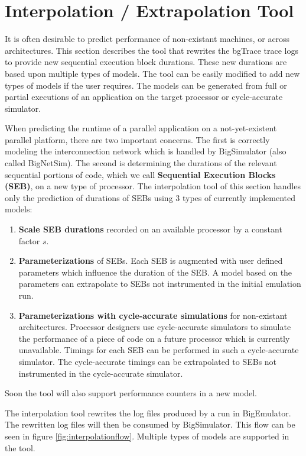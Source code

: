 \section{Interpolation / Extrapolation Tool\label{interpolation}}

It is often desirable to predict performance of non-existant machines, or across architectures. This section describes the  tool that rewrites the bgTrace trace logs to provide new sequential execution block durations. These new durations are based upon multiple types of models. The tool can be easily modified to add new types of models if the user requires. The models can be generated from full or partial executions of an application on the target processor or cycle-accurate simulator. 


When predicting the runtime of a parallel application on a not-yet-existent parallel platform, there are two important concerns. The first is correctly modeling the interconnection network which is handled by BigSimulator (also called BigNetSim). The second is determining the durations of the relevant sequential portions of code, which we call \textbf{Sequential Execution Blocks (SEB)}, on a new type of processor. The interpolation tool of this section handles only the prediction of durations of SEBs using 3 types of currently implemented models:

\begin{enumerate}
\item \textbf{Scale SEB durations} recorded on an available processor by a constant factor $s$.
\item \textbf{Parameterizations} of SEBs. Each SEB is augmented with user defined parameters which influence the duration of the SEB. A model based on the parameters can extrapolate to SEBs not instrumented in the initial emulation run.
\item \textbf{Parameterizations with cycle-accurate simulations} for non-existant architectures. Processor designers use cycle-accurate simulators to simulate the performance of a piece of code on a future processor which is currently unavailable.  Timings for each SEB can be performed in such a cycle-accurate simulator. The cycle-accurate timings can be extrapolated to SEBs not instrumented in the cycle-accurate simulator.
\end{enumerate}

Soon the tool will also support performance counters in a new model.

The interpolation tool rewrites the log files produced by a run in BigEmulator. The rewritten log files will then be consumed by BigSimulator. This flow can be seen in figure \ref{fig:interpolationflow}. Multiple types of models are supported in the tool. 

